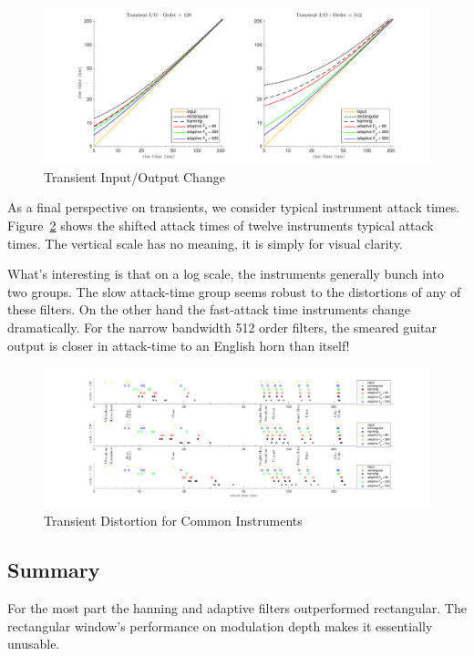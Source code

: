 \documentclass [11pt, proquest,oneside] {uwthesis}[2015/03/03]
\begin{document}
\begin{figure}[!ht]
  \centering
    \includegraphics[width=1\textwidth]{transient_2}
    \caption{Transient Input/Output Change}\label{fig:transient_2}
\end{figure}

As a final perspective on transients, we consider typical instrument attack times.  Figure~\ref{fig:transient_3} shows the shifted attack times of twelve instruments typical attack times.  The vertical scale has no meaning, it is simply for visual clarity.

What's interesting is that on a log scale, the instruments generally bunch into two groups.  The slow attack-time group seems robust to the distortions of any of these filters.  On the other hand the fast-attack time instruments change dramatically.  For the narrow bandwidth 512 order filters, the smeared guitar output is closer in attack-time to an English horn than itself!

\begin{figure}[!ht]
  \centering
    \includegraphics[width=1.2\textwidth]{transient_3}
    \caption{Transient Distortion for Common Instruments}\label{fig:transient_3}
\end{figure}


\subsection{Summary}

For the most part the hanning and adaptive filters outperformed rectangular.  The rectangular window's performance on modulation depth makes it essentially unusable.
\end{document}
